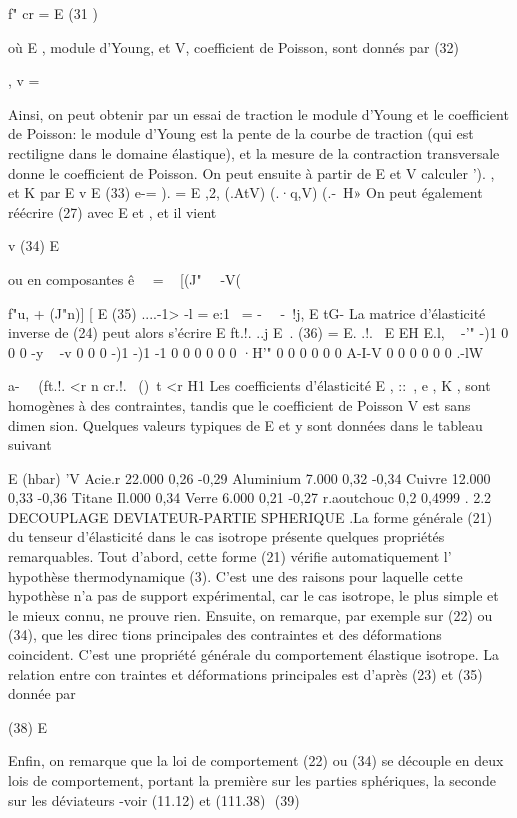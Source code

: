 {f"
cr 
= 
E 
(31 ) 

où E , module d'Young, et V, coefficient de Poisson, sont donnés par 
(32) 

, v = 

Ainsi, on peut obtenir par un essai de traction le module d'Young 
et le coefficient de Poisson: le module d'Young est la pente de la courbe de traction (qui est rectiligne dans le domaine élastique), et la mesure de la 
contraction transversale donne le coefficient de Poisson. On peut ensuite à 
partir de E et V calculer '). , ~ et K par 
E v E
(33) e-= ). = 
E 
,2, (.AtV) (.·q,V) (.-\ H» On peut également réécrire (27) avec E et \J , et il vient 

v
(34) 
E 

ou en composantes 
ê~~ = ~ [(J"~~ -V( {f"u, + (J"n)]
[ E 
(35) 
....-1> -l 
=
e:1~ = -~~ -~!j,
E tG-
La matrice d'élasticité inverse de (24) peut alors s'écrire 
E 
ft.!. 
..j
E~. 
(36) 
= 
E. .!.~ 
E 
EH 
E.l, 
~  -'"  -)1  0  0  0  
-y  ~  -v  0  0  0  
-)1  -)1  -1  0  0  0  
0  0  0  ·H'"  0  0  
0  0  0  0  A-I-V  0  
0  0  0  0  0  .-lW  

a-~~ 
(ft.!. <r 
n 
cr.!.~ ()~t 
<r
H1 
Les coefficients d'élasticité  E ,  ::\  , e­ ,  K  , sont homogènes  
à  des contraintes,  tandis que  le coefficient de Poisson  V  est  sans  dimen­ 
sion.  Quelques valeurs  typiques de  E  et  y  sont  données  dans  le tableau  
suivant  

E (hbar) 'V 
Acie.r 22.000 0,26 -0,29 
Aluminium 7.000 0,32 -0,34 Cuivre 12.000 0,33 -0,36 Titane Il.000 0,34 
Verre 6.000 0,21 -0,27 r.aoutchouc 0,2 0,4999 . 
2.2 DECOUPLAGE DEVIATEUR-PARTIE SPHERIQUE 
.La forme générale (21) du tenseur d'élasticité dans le cas isotrope présente quelques propriétés remarquables. 
Tout d'abord, cette forme (21) vérifie automatiquement l' hypothèse thermodynamique (3). C'est une des raisons pour laquelle cette hypothèse n'a pas de support expérimental, car le cas isotrope, le plus simple et le mieux connu, ne prouve rien. 
Ensuite, on remarque, par exemple sur (22) ou (34), que les direc­
tions principales des contraintes et des déformations coincident. C'est une propriété générale du comportement élastique isotrope. La relation entre con­
traintes et déformations principales est d'après (23) et (35) donnée par 

(38) 
E 

Enfin, on remarque que la loi de comportement (22) ou (34) se dé­couple en deux lois de comportement, portant la première sur les parties sphériques, la seconde sur les déviateurs -voir (11.12) et (111.38) ­
(39) 

}}
